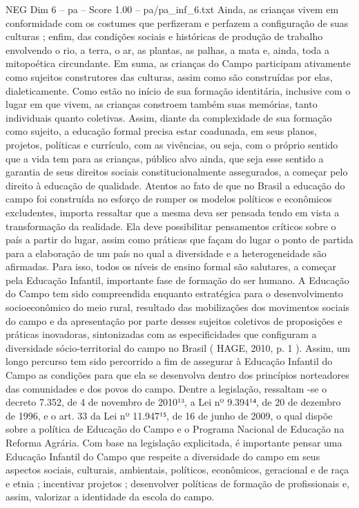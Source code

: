 \begin{textsample}{NEG Dim 6 – pa – Score 1.00 – pa/pa\_inf\_6.txt}
Ainda, as crianças vivem em conformidade com os costumes que perfizeram e perfazem a configuração de suas culturas ; enfim, das condições sociais e históricas de produção de trabalho envolvendo o rio, a terra, o ar, as plantas, as palhas, a mata e, ainda, toda a mitopoética circundante.
Em suma, as crianças do Campo participam ativamente como sujeitos construtores das culturas, assim como são construídas por elas, dialeticamente.
Como estão no início de sua formação identitária, inclusive com o lugar em que vivem, as crianças constroem também suas memórias, tanto individuais quanto coletivas.
Assim, diante da complexidade de sua formação como sujeito, a educação formal precisa estar coadunada, em seus planos, projetos, políticas e currículo, com as vivências, ou seja, com o próprio sentido que a vida tem para as crianças, público alvo ainda, que seja esse sentido a garantia de seus direitos sociais constitucionalmente assegurados, a começar pelo direito à educação de qualidade.
Atentos ao fato de que no Brasil a educação do campo foi construída no esforço de romper os modelos políticos e econômicos excludentes, importa ressaltar que a mesma deva ser pensada tendo em vista a transformação da realidade.
Ela deve possibilitar pensamentos críticos sobre o país a partir do lugar, assim como práticas que façam do lugar o ponto de partida para a elaboração de um país no qual a diversidade e a heterogeneidade são afirmadas.
Para isso, todos os níveis de ensino formal são salutares, a começar pela Educação Infantil, importante fase de formação do ser humano.
A Educação do Campo tem sido compreendida enquanto estratégica para o desenvolvimento socioeconômico do meio rural, resultado das mobilizações dos movimentos sociais do campo e da apresentação por parte desses sujeitos coletivos de proposições e práticas inovadoras, sintonizadas com as especificidades que configuram a diversidade sócio-territorial do campo no Brasil ( HAGE, 2010, p. 1 ).
Assim, um longo percurso tem sido percorrido a fim de assegurar à Educação Infantil do Campo as condições para que ela se desenvolva dentro dos princípios norteadores das comunidades e dos povos do campo.
Dentre a legislação, ressaltam -se o decreto 7.352, de 4 de novembro de 2010¹³, a Lei nº 9.394¹⁴, de 20 de dezembro de 1996, e o art. 33 da Lei nº 11.947¹⁵, de 16 de junho de 2009, o qual dispõe sobre a política de Educação do Campo e o Programa Nacional de Educação na Reforma Agrária.
Com base na legislação explicitada, é importante pensar uma Educação Infantil do Campo que respeite a diversidade do campo em seus aspectos sociais, culturais, ambientais, políticos, econômicos, geracional e de raça e etnia ; incentivar projetos ; desenvolver políticas de formação de profissionais e, assim, valorizar a identidade da escola do campo.

\end{textsample}

